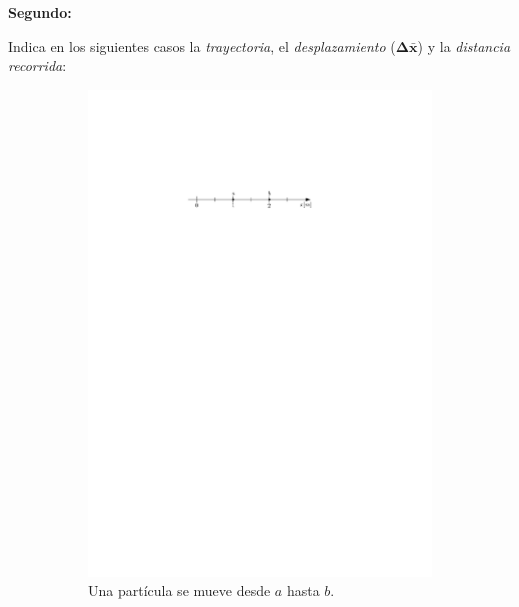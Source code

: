 \begin{comprension}
\noindent
{\bf Segundo:}

Indica en los siguientes casos la {\it trayectoria}, el {\it desplazamiento } ($\mathbold{\Delta \bar{x}}$) y la {\it distancia recorrida}:

\begin{figure}[H]
 \begin{subfigure}{0.5\textwidth}
    \centering
 	\includegraphics[width=.9\linewidth]{img/p_t_d_ej1.pdf}
	\caption{Una partícula se mueve desde $a$ hasta $b$.}	
\end{subfigure}   
 \begin{subfigure}{0.5\textwidth}
    \centering

\end{subfigure}
\end{figure}
\end{comprension}
